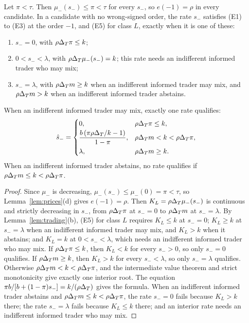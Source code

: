 \begin{lemma}\label{lem:a4-low}
Let \(\pi<\tau\). Then \(\mu_-(s_-)\le\pi<\tau\) for every \(s_-\), so \(e(-1)=\rho\) in every candidate. In a
candidate with no wrong-signed order, the rate \(s_-\) satisfies (E1) to (E3) at the order \(-1\), and (E5) for class
\(L\), exactly when it is one of these:
\begin{enumerate}[leftmargin=2.5em]
\item[(N)] \(s_-=0\), with \(\rho\Delta_T\pi\le k\);
\item[(Q)] \(0<s_-<\lambda\), with \(\rho\Delta_T\mu_-(s_-)=k\); this rate needs an indifferent informed trader who may mix;
\item[(F)] \(s_-=\lambda\), with \(\rho\Delta_T m\ge k\) when an indifferent informed trader may mix, and \(\rho\Delta_T m>k\) when an
indifferent informed trader abstains.
\end{enumerate}
When an indifferent informed trader may mix, exactly one rate qualifies:
\[
\hat s_-=\begin{cases}0, & \rho\Delta_T\pi\le k,\\[2pt]
\dfrac{b\,(\pi\rho\Delta_T/k-1)}{1-\pi}, & \rho\Delta_T m<k<\rho\Delta_T\pi,\\[6pt]
\lambda, & \rho\Delta_T m\ge k.\end{cases}
\]
When an indifferent informed trader abstains, no rate qualifies if \(\rho\Delta_T m\le k<\rho\Delta_T\pi\).
\end{lemma}

\begin{proof}
Since \(\mu_-\) is decreasing, \(\mu_-(s_-)\le\mu_-(0)=\pi<\tau\), so Lemma~\ref{lem:prices}(d) gives \(e(-1)=\rho\).
Then \(K_L=\rho\Delta_T\mu_-(s_-)\) is continuous and strictly decreasing in \(s_-\), from \(\rho\Delta_T\pi\) at \(s_-=0\) to
\(\rho\Delta_T m\) at \(s_-=\lambda\). By Lemma~\ref{lem:trading}(b), (E5) for class \(L\) requires \(K_L\le k\) at
\(s_-=0\); \(K_L\ge k\) at \(s_-=\lambda\) when an indifferent informed trader may mix, and \(K_L>k\) when it abstains; and
\(K_L=k\) at \(0<s_-<\lambda\), which needs an indifferent informed trader who may mix. If \(\rho\Delta_T\pi\le k\), then
\(K_L<k\) for every \(s_->0\), so only \(s_-=0\) qualifies. If \(\rho\Delta_T m\ge k\), then \(K_L>k\) for every
\(s_-<\lambda\), so only \(s_-=\lambda\) qualifies. Otherwise \(\rho\Delta_T m<k<\rho\Delta_T\pi\), and the intermediate value
theorem and strict monotonicity give exactly one interior root. The equation \(\pi b/[b+(1-\pi)s_-]=k/(\rho\Delta_T)\)
gives the formula. When an indifferent informed trader abstains and \(\rho\Delta_T m\le k<\rho\Delta_T\pi\), the rate \(s_-=0\) fails
because \(K_L>k\) there; the rate \(s_-=\lambda\) fails because \(K_L\le k\) there; and an interior rate needs an
indifferent informed trader who may mix.
\end{proof}

